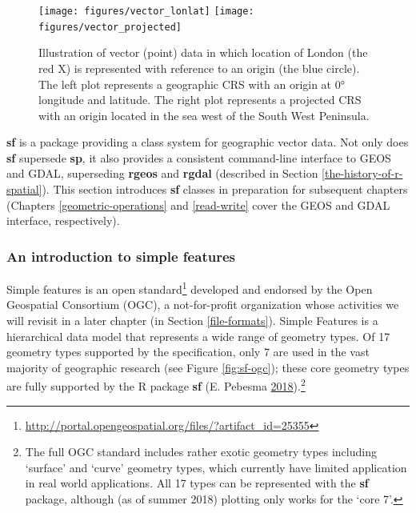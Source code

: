\documentclass[]{krantz}
\let\rmarkdownfootnote\footnote%
\def\footnote{\protect\rmarkdownfootnote}
\renewcommand{\href}[2]{#2\footnote{\url{#1}}}
\begin{document}
\begin{figure}[t]

{\centering \texttt{[image: figures/vector\_lonlat]} \texttt{[image: figures/vector\_projected]} 

}

\caption[Illustration of vector (point) data.]{Illustration of vector (point) data in which location of London (the red X) is represented with reference to an origin (the blue circle). The left plot represents a geographic CRS with an origin at 0° longitude and latitude. The right plot represents a projected CRS with an origin located in the sea west of the South West Peninsula.}\label{fig:vectorplots}
\end{figure}

\textbf{sf} is a package providing a class system for geographic vector data.
Not only does \textbf{sf} supersede \textbf{sp}, it also provides a consistent command-line interface to GEOS and GDAL, superseding \textbf{rgeos} and \textbf{rgdal} (described in Section \ref{the-history-of-r-spatial}).
This section introduces \textbf{sf} classes in preparation for subsequent chapters (Chapters \ref{geometric-operations} and \ref{read-write} cover the GEOS and GDAL interface, respectively).

\hypertarget{intro-sf}{%
\subsubsection{An introduction to simple features}\label{intro-sf}}

Simple features is an \href{http://portal.opengeospatial.org/files/?artifact_id=25355}{open standard} developed and endorsed by the Open Geospatial Consortium (OGC), a not-for-profit organization whose activities we will revisit in a later chapter (in Section \ref{file-formats}).
Simple Features is a hierarchical data model that represents a wide range of geometry types.
Of 17 geometry types supported by the specification, only 7 are used in the vast majority of geographic research (see Figure \ref{fig:sf-ogc});
these core geometry types are fully supported by the R package \textbf{sf} (E. Pebesma \protect\hyperlink{ref-pebesma_simple_2018}{2018}).\footnote{The full OGC standard includes rather exotic geometry types including `surface' and `curve' geometry types, which currently have limited application in real world applications.
  All 17 types can be represented with the \textbf{sf} package, although (as of summer 2018) plotting only works for the `core 7'.}
\end{document}
